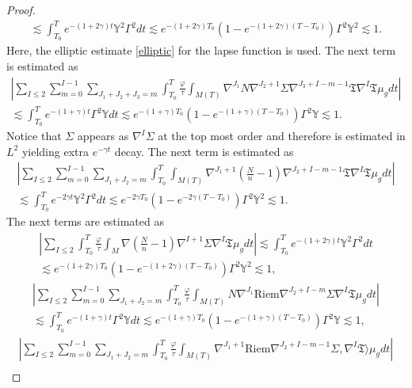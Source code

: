 \documentclass{amsart}
\begin{document}
\begin{proof}
\begin{align}
\lesssim \int_{T_{0}}^{T}e^{-(1+2\gamma)t}\mathds{Y}^{2}\Gamma^{2}dt \lesssim e^{-(1+2\gamma) T_{0}}(1-e^{-(1+2\gamma)(T-T_{0})})\Gamma^{2}\mathds{Y}^{2} \lesssim 1. 
\end{align}
\noindent Here, the elliptic estimate \ref{elliptic} for the lapse function is used. The next term is estimated as 
\begin{align}
|\sum_{I\leq 2}\sum_{m=0}^{I-1}\sum_{J_{1}+J_{2}+J_{3}=m}\int_{T_{0}}^{T}\frac{\varphi}{\tau}\int_{M(T)}\nabla^{J_{1}}N\nabla^{J_{2}+1}\Sigma\nabla^{J_{3}+I-m-1}\mathfrak{T}\nabla^{I}\mathfrak{T}\mu_{g}dt|\\\nonumber 
\lesssim \int_{T_{0}}^{T}e^{-(1+\gamma)t}\Gamma^{2}\mathds{Y}dt\lesssim e^{-(1+\gamma) T_{0}}(1-e^{-(1+\gamma)(T-T_{0})})\Gamma^{2}\mathds{Y}\lesssim 1. 
\end{align}
Notice that $\Sigma$ appears as $\nabla^{I}\Sigma$ at the top most order and therefore is estimated in $L^{2}$ yielding extra $e^{-\gamma t}$ decay. The next term is estimated as 
\begin{align}
|\sum_{I\leq 2}\sum_{m=0}^{I-1}\sum_{J_{1}+J_{2}=m}\int_{T_{0}}^{T}\int_{M(T)}\nabla^{J_{1}+1}(\frac{N}{n}-1)\nabla^{J_{2}+I-m-1}\mathfrak{T}\nabla^{I}\mathfrak{T}\mu_{g}dt|\\\nonumber 
\lesssim \int_{T_{0}}^{T}e^{-2\gamma t}\mathds{Y}^{2}\Gamma^{2}dt\lesssim e^{-2\gamma T_{0}}(1-e^{-2\gamma(T-T_{0})})\Gamma^{2}\mathds{Y}^{2}\lesssim 1.
\end{align}
The next terms are estimated as 
\begin{align}
|\sum_{I\leq 2}\int_{T_{0}}^{T}\frac{\varphi}{\tau}\int_{M}\nabla(\frac{N}{n}-1)\nabla^{I+1}\Sigma\nabla^{I}\mathfrak{T}\mu_{g}dt|\lesssim \int_{T_{0}}^{T}e^{-(1+2\gamma)t}\mathds{Y}^{2}\Gamma^{2}dt\\\nonumber \lesssim e^{-(1+2\gamma) T_{0}}(1-e^{-(1+2\gamma)(T-T_{0})})\Gamma^{2}\mathds{Y}^{2} \lesssim 1,     
\end{align}
\begin{align}
|\sum_{I\leq 2}\sum_{m=0}^{I-1}\sum_{J_{1}+J_{2}=m}\int_{T_{0}}^{T}\frac{\varphi}{\tau}\int_{M(T)}N\nabla^{J_{1}}\text{Riem}\nabla^{J_{2}+I-m}\Sigma\nabla^{I}\mathfrak{T}\mu_{g}dt|\\\nonumber 
\lesssim \int_{T_{0}}^{T}e^{-(1+\gamma)t}\Gamma^{2}\mathds{Y}dt\lesssim e^{-(1+\gamma) T_{0}}(1-e^{-(1+\gamma)(T-T_{0})})\Gamma^{2}\mathds{Y} \lesssim 1,    
\end{align}
\begin{align}
 |\sum_{I\leq 2}\sum_{m=0}^{I-1}\sum_{J_{1}+J_{2}=m}\int_{T_{0}}^{T}\frac{\varphi}{\tau}\int_{M(T)}\nabla^{J_{1}+1}\text{Riem}\nabla^{J_{2}+I-m-1}\Sigma,\nabla^{I}\mathfrak{T}\rangle\mu_{g}dt|\\\nonumber 

\end{align}
\end{proof}
\end{document}
